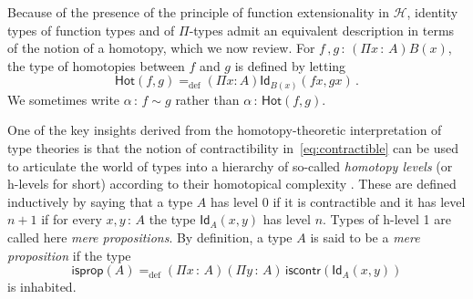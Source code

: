 \documentclass[10pt,a4paper,oneside,reqno]{amsart}
\numberwithin{equation}{section}
\theoremstyle{mythm}
\theoremstyle{mydef}
\theoremstyle{myrmk}
\newcommand{\defeq}{=_{\mathrm{def}}}
\newcommand{\co}{\,{:}\,}
\newcommand{\Hint}{\mathcal{H}}
\newcommand{\iscontr}{\mathsf{iscontr}}
\newcommand{\isprop}{\mathsf{isprop}}
\newcommand{\Hot}{\mathsf{Hot}}
\newcommand{\Id}{\mathsf{Id}}
\begin{document}
Because of the presence of the principle of function extensionality in $\Hint$, 
identity types of function types and of $\Pi$-types admit an equivalent description in terms of the notion of
a homotopy, which we now review.  For $f \, , g \co (\Pi x \co A) B(x)$, the type of homotopies between $f$ and $g$ 
is defined by letting
\[
\Hot(f,g) \defeq (\Pi x:A) \Id_{B(x)}(fx,gx) \, .
\]
We sometimes write  $\alpha \co f \sim g$ rather than $\alpha \co \Hot(f,g)$. 

One of the key insights derived from the homotopy-theoretic interpretation of type theories is that
the notion of contractibility in~\eqref{eq:contractible}  can be used to articulate the world of types  
into a hierarchy of so-called \emph{homotopy levels} (or h-levels for short) according to their homotopical complexity \cite{VoevodskyV:notts}. These
are defined inductively by saying that a type $A$ has level $0$ if it is contractible and it has level
$n+1$ if for every $x, y \co A$ the type $\Id_A(x,y)$ has level $n$. Types of h-level 1 are called 
here \emph{mere propositions}. By definition, a type $A$ is said to be a \emph{mere proposition} if the type
\[
\isprop(A) \defeq (\Pi x \co A)(\Pi  y \co A) \, \iscontr( \Id_A(x,y)) 
\]
is inhabited.
\end{document}
